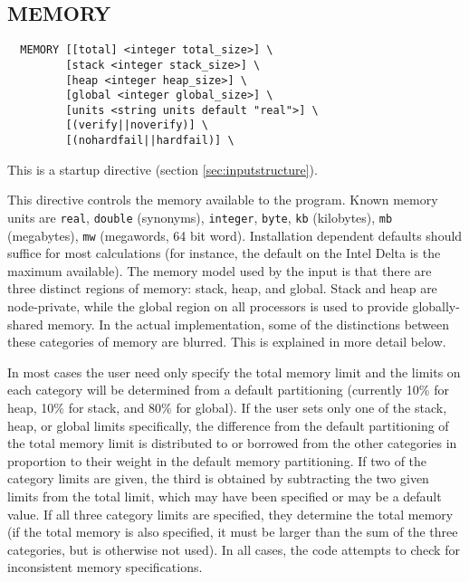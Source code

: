 \subsection{MEMORY}

\begin{verbatim}
  MEMORY [[total] <integer total_size>] \
         [stack <integer stack_size>] \
         [heap <integer heap_size>] \
         [global <integer global_size>] \
         [units <string units default "real">] \
         [(verify||noverify)] \
         [(nohardfail||hardfail)] \
\end{verbatim}

This is a startup directive (section \ref{sec:inputstructure}).

This directive controls the memory available to the program.  Known
memory units are \verb+real+, \verb+double+ (synonyms),
\verb+integer+, \verb+byte+, \verb+kb+ (kilobytes), \verb+mb+
(megabytes), \verb+mw+ (megawords, 64 bit word).  Installation
dependent defaults should suffice for most calculations (for instance,
the default on the Intel Delta is the maximum available).  The memory
model used by the input is that there are three distinct regions of
memory: stack, heap, and global.  Stack and heap are node-private,
while the global region on all processors is used to provide
globally-shared memory.  In the actual implementation, some of the
distinctions between these categories of memory are blurred.  This is
explained in more detail below.

In most cases the user need only specify the total memory limit and
the limits on each category will be determined from a default
partitioning (currently 10\% for heap, 10\% for stack, and 80\% for
global).  If the user sets only one of the stack, heap, or global
limits specifically, the difference from the default partitioning of
the total memory limit is distributed to or borrowed from the other
categories in proportion to their weight in the default memory
partitioning.  If two of the category limits are given, the third is
obtained by subtracting the two given limits from the total limit,
which may have been specified or may be a default value.  If all three
category limits are specified, they determine the total memory (if the
total memory is also specified, it must be larger than the sum of the
three categories, but is otherwise not used).  In all cases, the code
attempts to check for inconsistent memory specifications.


